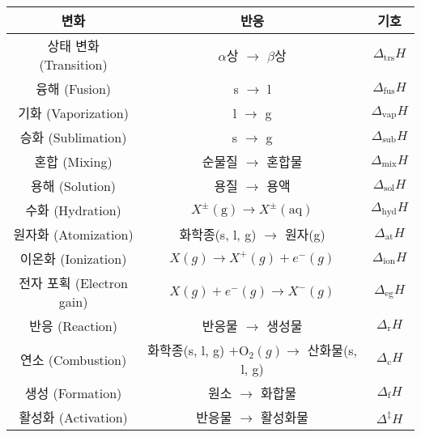             \begin{table}[H]
            \centering
                \begin{tabular}{ c c c }
                    \hline
                    \rowcolor{lightgray}
                    변화 & 반응 & 기호 \\
                    \hline
                    상태 변화 (Transition) & $\alpha$상 $\rightarrow$ $\beta$상 & $\Delta_{\mathrm{trs}}H$\\
                    융해 (Fusion) & s $\rightarrow$ l & $\Delta_{\mathrm{fus}}H$ \\
                    기화 (Vaporization) & l $\rightarrow$ g & $\Delta_{\mathrm{vap}}H$ \\
                    승화 (Sublimation) & s $\rightarrow$ g & $\Delta_{\mathrm{sub}}H$ \\
                    혼합 (Mixing) & 순물질 $\rightarrow$ 혼합물 & $\Delta_{\mathrm{mix}}H$ \\
                    용해 (Solution) & 용질 $\rightarrow$ 용액 & $\Delta_{\mathrm{sol}}H$ \\
                    수화 (Hydration) & $X^{\pm}\left(\mathrm{g}\right) \rightarrow X^{\pm}\left(\mathrm{aq}\right)$ & $\Delta_{\mathrm{hyd}}H$ \\
                    원자화 (Atomization) & 화학종(s, l, g) $\rightarrow$ 원자(g) & $\Delta_{\mathrm{at}}H$ \\
                    이온화 (Ionization) & $X \left(g\right) \rightarrow X^{+}\left(g\right)+ e^{-}\left(g\right)$ & $\Delta_{\mathrm{ion}}H$ \\
                    전자 포획 (Electron gain) & $X \left(g\right) + e^{-}\left(g\right)\rightarrow X^{-}\left(g\right)$ & $\Delta_{\mathrm{eg}}H$ \\
                    반응 (Reaction) & 반응물 $\rightarrow$ 생성물 & $\Delta_{\mathrm{r}}H$ \\
                    연소 (Combustion) & 화학종(s, l, g) $+ \mathrm{O}_2 \left(g\right) \rightarrow$ 산화물(s, l, g) & $\Delta_{\mathrm{c}}H$ \\
                    생성 (Formation) & 원소 $\rightarrow$ 화합물 & $\Delta_{\mathrm{f}}H$ \\
                    활성화 (Activation) & 반응물 $\rightarrow$ 활성화물 & $\Delta^{\ddagger}H$ \\
                    \hline
                \end{tabular}
            \end{table}
